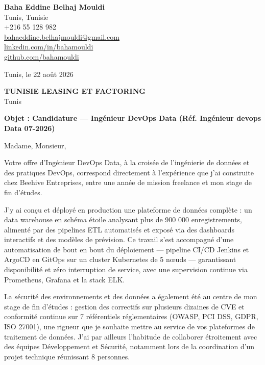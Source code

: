 \documentclass[a4paper,11pt]{article}
\begin{document}
\begin{flushright}
{\bfseries Baha Eddine Belhaj Mouldi}\\
Tunis, Tunisie\\
+216 55 128 982\\
\href{mailto:bahaeddine.belhajmouldi@gmail.com}{bahaeddine.belhajmouldi@gmail.com}\\
\href{https://linkedin.com/in/bahamouldi}{linkedin.com/in/bahamouldi}\\
\href{https://github.com/bahamouldi}{github.com/bahamouldi}
\end{flushright}

\vspace{0.8cm}

\begin{flushleft}
Tunis, le 22 août 2026

\vspace{0.8cm}

{\bfseries TUNISIE LEASING ET FACTORING}\\
Tunis

\vspace{0.6cm}

{\bfseries Objet : Candidature --- Ingénieur DevOps Data (Réf. Ingénieur devops Data 07-2026)}
\end{flushleft}

\vspace{0.6cm}

Madame, Monsieur,

Votre offre d'Ingénieur DevOps Data, à la croisée de l'ingénierie de données et des pratiques DevOps, correspond directement à l'expérience que j'ai construite chez Beehive Entreprises, entre une année de mission freelance et mon stage de fin d'études.

J'y ai conçu et déployé en production une plateforme de données complète : un data warehouse en schéma étoile analysant plus de 900 000 enregistrements, alimenté par des pipelines ETL automatisés et exposé via des dashboards interactifs et des modèles de prévision. Ce travail s'est accompagné d'une automatisation de bout en bout du déploiement --- pipeline CI/CD Jenkins et ArgoCD en GitOps sur un cluster Kubernetes de 5 nœuds --- garantissant disponibilité et zéro interruption de service, avec une supervision continue via Prometheus, Grafana et la stack ELK.

La sécurité des environnements et des données a également été au centre de mon stage de fin d'études : gestion des correctifs sur plusieurs dizaines de CVE et conformité continue sur 7 référentiels réglementaires (OWASP, PCI DSS, GDPR, ISO 27001), une rigueur que je souhaite mettre au service de vos plateformes de traitement de données. J'ai par ailleurs l'habitude de collaborer étroitement avec des équipes Développement et Sécurité, notamment lors de la coordination d'un projet technique réunissant 8 personnes.
\end{document}
